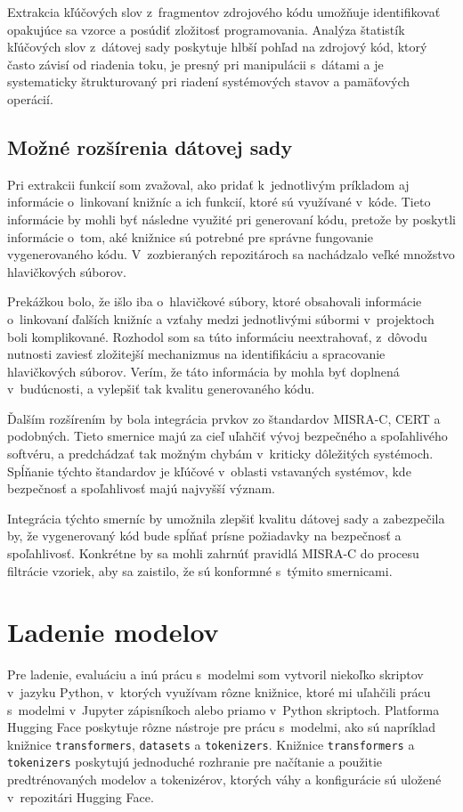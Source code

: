 Extrakcia kľúčových slov z~fragmentov zdrojového kódu umožňuje identifikovať opakujúce sa vzorce a posúdiť zložitosť programovania. Analýza štatistík kľúčových slov z~dátovej sady poskytuje hlbší pohľad na zdrojový kód, ktorý často závisí od riadenia toku, je presný pri manipulácii s~dátami a je systematicky štrukturovaný pri riadení systémových stavov a pamäťových operácií.

\subsection{Možné rozšírenia dátovej sady}

Pri extrakcii funkcií som zvažoval, ako pridať k~jednotlivým príkladom aj informácie o~linkovaní knižníc a ich funkcií, ktoré sú využívané v~kóde. Tieto informácie by mohli byť následne využité pri generovaní kódu, pretože by poskytli informácie o~tom, aké knižnice sú potrebné pre správne fungovanie vygenerovaného kódu. V~zozbieraných repozitároch sa nachádzalo veľké množstvo hlavičkových súborov.

Prekážkou bolo, že išlo iba o~hlavičkové súbory, ktoré obsahovali informácie o~linkovaní ďalších knižníc a vzťahy medzi jednotlivými súbormi v~projektoch boli komplikované. Rozhodol som sa túto informáciu neextrahovať, z~dôvodu nutnosti zaviesť zložitejší mechanizmus na identifikáciu a spracovanie hlavičkových súborov. Verím, že táto informácia by mohla byť doplnená v~budúcnosti, a vylepšiť tak kvalitu generovaného kódu.

Ďalším rozšírením by bola integrácia prvkov zo štandardov \textup{MISRA-C}, \textup{CERT} a podobných. Tieto smernice majú za cieľ uľahčiť vývoj bezpečného a spoľahlivého softvéru,  a predchádzať tak možným chybám v~kriticky dôležitých systémoch. Spĺňanie týchto štandardov je kľúčové v~oblasti vstavaných systémov, kde bezpečnosť a spoľahlivosť majú najvyšší význam.

Integrácia týchto smerníc by umožnila zlepšiť kvalitu dátovej sady a zabezpečila by, že vygenerovaný kód bude spĺňať prísne požiadavky na bezpečnosť a spoľahlivosť. Konkrétne by sa mohli zahrnúť pravidlá MISRA-C do procesu filtrácie vzoriek, aby sa zaistilo, že sú konformné s~týmito smernicami.

\section{Ladenie modelov}\label{sec:finetuning}

Pre ladenie, evaluáciu a inú prácu s~modelmi som vytvoril niekoľko skriptov v~jazyku Python, v~ktorých využívam rôzne knižnice, ktoré mi uľahčili prácu s~modelmi v~Jupyter zápisníkoch alebo priamo v~Python skriptoch. Platforma Hugging Face poskytuje rôzne nástroje pre prácu s~modelmi, ako sú napríklad knižnice \texttt{transformers}, \texttt{datasets} a \texttt{tokenizers}. Knižnice \texttt{transformers} a \texttt{tokenizers} poskytujú jednoduché rozhranie pre načítanie a použitie predtrénovaných modelov a tokenizérov, ktorých váhy a konfigurácie sú uložené v~repozitári Hugging Face.


